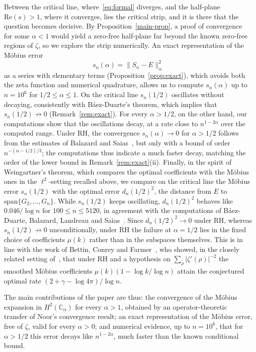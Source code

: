 \documentclass[11pt]{extarticle}
\numberwithin{equation}{section}
\theoremstyle{plain}
\theoremstyle{remark}
\begin{document}
Between the critical line, where~\eqref{eq:formal} diverges, and the half-plane
$\mathrm{Re}(s) > 1$, where it converges, lies the critical strip, and it is there
that the question becomes decisive. By Proposition~\ref{main-prop}, a proof of
convergence for some $\alpha < 1$ would yield a zero-free half-plane far beyond the
known zero-free regions of $\zeta$, so we explore the strip numerically. An exact
representation of the M\"obius error
\[
s_n(\alpha) = \|S_n - E\|^2_\alpha
\]
as a series with elementary terms (Proposition~\ref{prop:exact}), which avoids both
the zeta function and numerical quadrature, allows us to compute $s_n(\alpha)$ up to
$n = 10^6$ for $1/2 \leq \alpha \leq 1$. On the critical line $s_n(1/2)$ oscillates
without decaying, consistently with Báez-Duarte's theorem, which implies that
$s_n(1/2) \not\to 0$ (Remark~\ref{rem:exact}). For every $\alpha > 1/2$, on the
other hand, our computations show that the oscillations decay, at a rate close to
$n^{1-2\alpha}$ over the computed range. Under RH, the convergence
$s_n(\alpha) \to 0$ for $\alpha > 1/2$ follows from the estimates of Balazard and
Saias~\cite[Lemmes~4 et~5]{Balazard}, but only with a bound of order
$n^{-(\alpha-1/2)/3}$; the computations thus indicate a much faster decay, matching
the order of the lower bound in Remark~\ref{rem:exact}(ii). Finally,
in the spirit of Weingartner's theorem, which compares the optimal coefficients
with the M\"obius ones in the $\ell^2$-setting recalled above, we compare on the
critical line the
M\"obius error $s_n(1/2)$ with the optimal error $d_n(1/2)^2$, the distance from $E$
to $\mathrm{span}\{G_2, \dots, G_n\}$. While $s_n(1/2)$ keeps oscillating,
$d_n(1/2)^2$ behaves like $0.046/\log n$ for $100 \leq n \leq 5120$, in agreement with
the computations of B\'aez-Duarte, Balazard, Landreau and Saias~\cite{BBLS}. Since
$d_n(1/2)^2 \to 0$ under RH, whereas $s_n(1/2) \not\to 0$ unconditionally, under RH
the failure at $\alpha = 1/2$ lies in the fixed choice of coefficients $\mu(k)$
rather than in the subspaces themselves. This is in line with the work of Bettin,
Conrey and Farmer~\cite{BCF}, who showed, in the closely related setting
of~\cite{BBLS}, that under RH and a hypothesis on $\sum_\rho |\zeta'(\rho)|^{-2}$ the
smoothed M\"obius coefficients $\mu(k)(1 - \log k/\log n)$ attain the conjectured
optimal rate $(2 + \gamma - \log 4\pi)/\log n$.

The main contributions of the paper are thus: the convergence of the M\"obius
expansion in $H^2(\mathbb{C}_\alpha)$ for every $\alpha > 1$, obtained by an
operator-theoretic transfer of Noor's convergence result; an exact representation
of the M\"obius error, free of $\zeta$, valid for every $\alpha > 0$; and numerical
evidence, up to $n = 10^6$, that for $\alpha > 1/2$ this error decays like
$n^{1-2\alpha}$, much faster than the known conditional bound.
\end{document}
